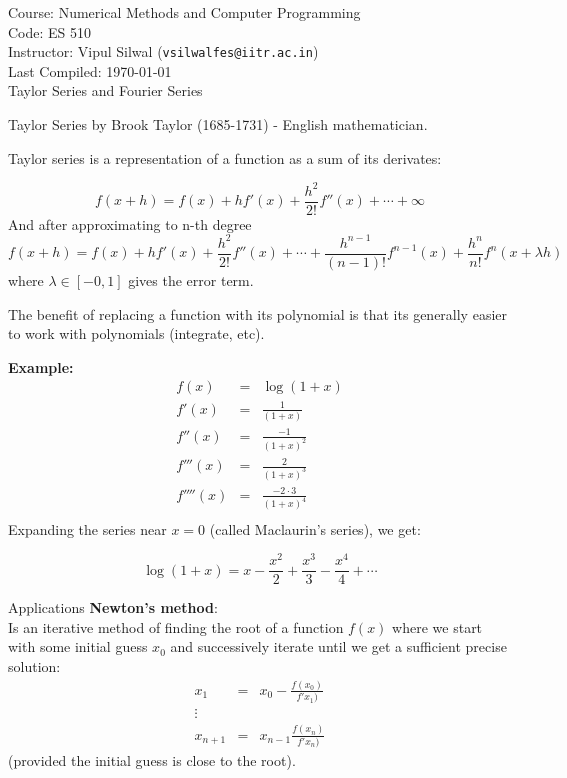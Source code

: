 \documentclass[11pt,titlepage,fleqn]{article}
\begin{document}
\noindent Course: Numerical Methods and Computer Programming\\
\noindent Code: ES 510\\
\noindent Instructor: Vipul Silwal (\verb+vsilwalfes@iitr.ac.in+) \\ 
\noindent Last Compiled: \today \\

{\huge Taylor Series and Fourier Series}

\tableofcontents
\begin{section}{Taylor Series}
by Brook Taylor (1685-1731) - English mathematician.

Taylor series is a representation of a function as a sum of its derivates: 

\begin{equation}
f(x+h) = f(x) + hf'(x) + \frac{h^2}{2!}f''(x) + \cdots + \infty 
\end{equation}
And after approximating to n-th degree
\begin{equation}
f(x+h) = f(x) + hf'(x) + \frac{h^2}{2!}f''(x) + \cdots +  \frac{h^{n-1}}{(n-1)!}f^{n-1}(x) + \frac{h^n}{n!}f^n(x + \lambda h)
\end{equation}
where $\lambda \in [-0,1]$ gives the error term.

The benefit of replacing a function with its polynomial is that its generally easier to work with polynomials (integrate, etc).

{\bf Example:}
\begin{eqnarray*}
f(x) &=& \log(1 + x) \\
f'(x) &=& \frac{1}{(1 + x)} \\
f''(x) &=& \frac{-1}{(1 + x)^2} \\
f'''(x) &=& \frac{2}{(1 + x)^3} \\
f''''(x) &=& \frac{-2 \cdot 3}{(1 + x)^4} \\
\end{eqnarray*}
Expanding the series near $x=0$ (called Maclaurin's series), we get:

\begin{equation*}
\log(1+x) = x - \frac{x^2}{2} + \frac{x^3}{3} - \frac{x^4}{4} + \cdots
\end{equation*}

\begin{subsection}{Applications}
{\bf Newton's method}: \\
Is an iterative method of finding the root of a function $f(x)$ where we start with some initial guess $x_0$ and successively iterate until we get a sufficient precise solution:
\begin{eqnarray}
x_1 &=& x_0 - \frac{f(x_0)}{f'x_1)} \\
\vdots \\
x_{n+1} &=&  x_{n-1}\frac{f(x_n)}{f'x_n)}
\end{eqnarray}
(provided the initial guess is close to the root). 


\end{subsection}
\end{section}
\end{document}
